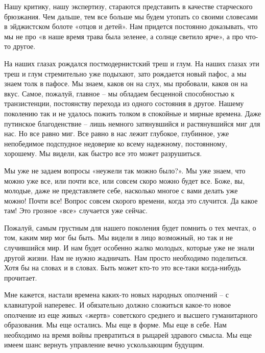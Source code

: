 Нашу критику, нашу экспертизу, стараются представить в качестве старческого
брюзжания. Чем дальше, тем все больше мы будем утопать со своими словесами в
эйджистском болоте «отцов и детей». Нам придется постоянно доказывать, что мы
не про «в наше время трава была зеленее, а солнце светило ярче», а про что-то
другое.

На наших глазах рождался постмодернистский треш и глум. На наших глазах эти
треш и глум стремительно уже подыхают, зато рождается новый пафос, а мы знаем
толк в пафосе. Мы знаем, каков он на слух, мы пробовали, каков он на вкус.
Самое, пожалуй, главное – мы обладаем бесценной способностью к транзистенции,
постоянству перехода из одного состояния в другое. Нашему поколению так и не
удалось пожить толком в спокойные и мирные времена. Даже путинское
благоденствие – лишь немного затянувшийся и растянувшийся миг для нас. Но все
равно миг. Все равно в нас лежит глубокое, глубинное, уже непобедимое
подспудное недоверие ко всему надежному, постоянному, хорошему. Мы видели, как
быстро все это может разрушиться.

Мы уже не задаем вопросы «неужели так можно было?». Мы уже знаем, что можно уже
все, или почти все, или совсем скоро можно будет все. Боже, вы, молодые, даже
не представляете себе, насколько многое с вами делать уже можно! Почти все!
Вопрос совсем скорого времени, когда это случится. Да какое там! Это грозное
«все» случается уже сейчас.

Пожалуй, самым грустным для нашего поколения будет помнить о тех мечтах, о том,
каким мир мог бы быть. Мы видели в лицо возможный, но так и не случившийся мир.
И нам будет особенно жалко молодых, которые уже не знали другой жизни. Нам не
нужно жадничать. Нам просто необходимо поделиться. Хотя бы на словах и в
словах. Быть может кто-то это все-таки когда-нибудь прочитает.

Мне кажется, настали времена каких-то новых народных ополчений – с клавиатурой
наперевес. И обязательно должно сложиться какое-то новое ополчение из еще живых
«жертв» советского среднего и высшего гуманитарного образования. Мы еще
остались. Мы еще в форме. Мы еще в себе. Нам необходимо на время войны
превратиться в рыцарей здравого смысла. Мы еще имеем шанс вернуть управление
вечно ускользающим будущим. 
